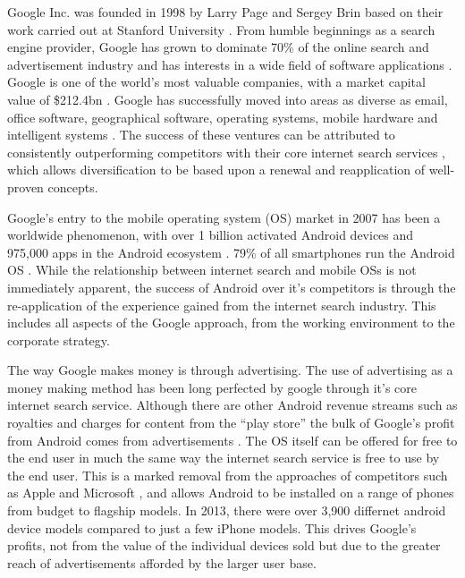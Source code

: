 {}
Google Inc. was founded in 1998 \cite{google:timeline} by Larry Page and Sergey Brin based on their work carried out at Stanford University \cite{brin1998anatomy}. From humble beginnings as a search engine provider, Google has grown to dominate 70\% of the online search and advertisement industry \cite{rothrmel2013strategic} and has interests in a wide field of software applications \cite{wheelen2012strategic}. Google is one of the world's most valuable companies, with a market capital value of \$212.4bn \cite{FT500}. Google has successfully moved into areas as diverse as email, office software, geographical software, operating systems, mobile hardware and intelligent systems \cite{rothrmel2013strategic, wheelen2012strategic}. The success of these ventures can be attributed to consistently outperforming competitors with their core internet search services \cite{wheelen2012strategic}, which allows diversification to be based upon a renewal and reapplication of well-proven concepts.

Google's entry to the mobile operating system (OS) market in 2007 has been a worldwide phenomenon, with over 1 billion activated Android devices and 975,000 apps in the Android ecosystem \cite{google:timeline}. 79\% of all smartphones run the Android OS \cite{krajci2013android}. While the relationship between internet search and mobile OSs is not immediately apparent, the success of Android over it's competitors is through the re-application of the experience gained from the internet search industry. This includes all aspects of the Google approach, from the working environment to the corporate strategy. 

The way Google makes money is through advertising. The use of advertising as a money making method has been long perfected by google through it's core internet search service. Although there are other Android revenue streams such as royalties and charges for content from the ``play store'' the bulk of Google's profit from Android comes from advertisements \cite{krajci2013android}. The OS itself can be offered for free to the end user in much the same way the internet search service is free to use by the end user. This is a marked removal from the approaches of competitors such as Apple and Microsoft \cite{rothrmel2013strategic}, and allows Android to be installed on a range of phones from budget to flagship models. In 2013, there were over 3,900 differnet android device models \cite{krajci2013android} compared to just a few iPhone models. This drives Google's profits, not from the value of the individual devices sold but due to the greater reach of advertisements afforded by the larger user base.  

